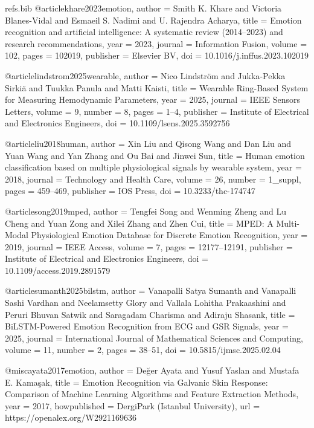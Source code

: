 \begin{filecontents*}[overwrite]{refs.bib}
@article{khare2023emotion,
  author = {Smith K. Khare and Victoria Blanes{-}Vidal and Esmaeil S. Nadimi and U. Rajendra Acharya},
  title = {{Emotion recognition and artificial intelligence: A systematic review (2014--2023) and research recommendations}},
  year = {2023},
  journal = {Information Fusion},
  volume = {102},
  pages = {102019},
  publisher = {Elsevier BV},
  doi = {10.1016/j.inffus.2023.102019}
}

@article{lindstrom2025wearable,
  author = {Nico Lindstr{\"o}m and Jukka{-}Pekka Sirki{\"a} and Tuukka Panula and Matti Kaisti},
  title = {{Wearable Ring-Based System for Measuring Hemodynamic Parameters}},
  year = {2025},
  journal = {IEEE Sensors Letters},
  volume = {9},
  number = {8},
  pages = {1--4},
  publisher = {Institute of Electrical and Electronics Engineers},
  doi = {10.1109/lsens.2025.3592756}
}

@article{liu2018human,
  author = {Xin Liu and Qisong Wang and Dan Liu and Yuan Wang and Yan Zhang and Ou Bai and Jinwei Sun},
  title = {{Human emotion classification based on multiple physiological signals by wearable system}},
  year = {2018},
  journal = {Technology and Health Care},
  volume = {26},
  number = {1\_suppl},
  pages = {459--469},
  publisher = {IOS Press},
  doi = {10.3233/thc-174747}
}

@article{song2019mped,
  author = {Tengfei Song and Wenming Zheng and Lu Cheng and Yuan Zong and Xilei Zhang and Zhen Cui},
  title = {{MPED: A Multi-Modal Physiological Emotion Database for Discrete Emotion Recognition}},
  year = {2019},
  journal = {IEEE Access},
  volume = {7},
  pages = {12177--12191},
  publisher = {Institute of Electrical and Electronics Engineers},
  doi = {10.1109/access.2019.2891579}
}

@article{sumanth2025bilstm,
  author = {Vanapalli Satya Sumanth and Vanapalli Sashi Vardhan and Neelamsetty Glory and Vallala Lohitha Prakaashini and Peruri Bhuvan Satwik and Saragadam Charisma and Adiraju Shasank},
  title = {{BiLSTM-Powered Emotion Recognition from ECG and GSR Signals}},
  year = {2025},
  journal = {International Journal of Mathematical Sciences and Computing},
  volume = {11},
  number = {2},
  pages = {38--51},
  doi = {10.5815/ijmsc.2025.02.04}
}

@misc{ayata2017emotion,
  author = {De{\u{g}}er Ayata and Yusuf Yaslan and Mustafa E. Kama{\c{s}}ak},
  title = {{Emotion Recognition via Galvanic Skin Response: Comparison of Machine Learning Algorithms and Feature Extraction Methods}},
  year = {2017},
  howpublished = {DergiPark (Istanbul University)},
  url = {https://openalex.org/W2921169636}
}


\end{filecontents*}
